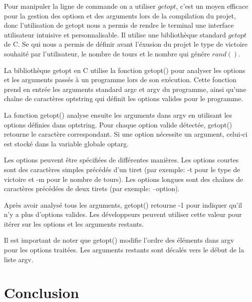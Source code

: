 \documentclass[a4paper]{article}
\begin{document}
Pour manipuler la ligne de commande on a utiliser $getopt$, c'est un moyen efficace pour la gestion des optiosn et des arguments lors de la compilation du projet, donc l'utilisation de getopt nous a permis de rendre le terminal une interface utilisateur intuisive et personnalisable. Il utilise une bibliothèque standard $getopt$ de C. Se qui nous a permis de définir avant l'éxusion du projet le type de victoire souhaité par l'utilisateur, le nombre de tours et le nombre qui génére $rand()$. 

La bibliothèque getopt en C utilise la fonction getopt() pour analyser les options et les arguments passés à un programme lors de son exécution. Cette fonction prend en entrée les arguments standard argc et argv du programme, ainsi qu'une chaîne de caractères optstring qui définit les options valides pour le programme.

La fonction getopt() analyse ensuite les arguments dans argv en utilisant les options définies dans optstring. Pour chaque option valide détectée, getopt() retourne le caractère correspondant. Si une option nécessite un argument, celui-ci est stocké dans la variable globale optarg.

Les options peuvent être spécifiées de différentes manières. Les options courtes sont des caractères simples précédés d'un tiret (par exemple: -t pour le type de victoire et -m pour le nombre de tours). Les options longues sont des chaînes de caractères précédées de deux tirets (par exemple: --option).

Après avoir analysé tous les arguments, getopt() retourne -1 pour indiquer qu'il n'y a plus d'options valides. Les développeurs peuvent utiliser cette valeur pour itérer sur les options et les arguments restants.

Il est important de noter que getopt() modifie l'ordre des éléments dans argv pour les options traitées. Les arguments restants sont décalés vers le début de la liste argv.


\section{Conclusion}
\end{document}
